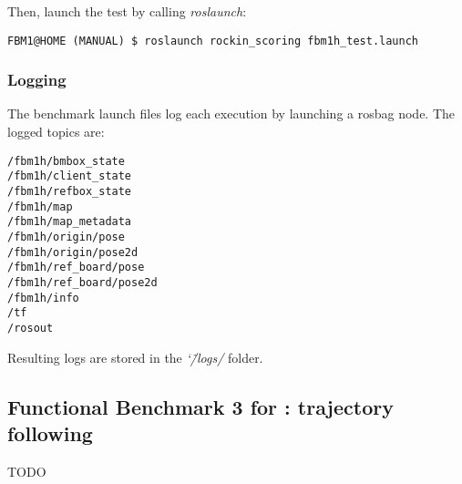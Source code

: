 \documentclass[a4paper]{article}
\newcommand{\logdir}{\char`\~/logs/}
\begin{document}
Then, launch the test by calling \emph{roslaunch}:
\begin{verbatim}
FBM1@HOME (MANUAL) $ roslaunch rockin_scoring fbm1h_test.launch
\end{verbatim}

\clearpage

\subsubsection{Logging}

The benchmark launch files log each execution by launching a rosbag node.
The logged topics are:

\begin{verbatim}
/fbm1h/bmbox_state
/fbm1h/client_state
/fbm1h/refbox_state
/fbm1h/map
/fbm1h/map_metadata
/fbm1h/origin/pose
/fbm1h/origin/pose2d
/fbm1h/ref_board/pose
/fbm1h/ref_board/pose2d
/fbm1h/info
/tf
/rosout
\end{verbatim}

Resulting logs are stored in the \emph{\logdir} folder.

\clearpage

\subsection{Functional Benchmark 3 for \ro@Work: trajectory following}
\label{sec:fbm3w}
TODO
\end{document}
